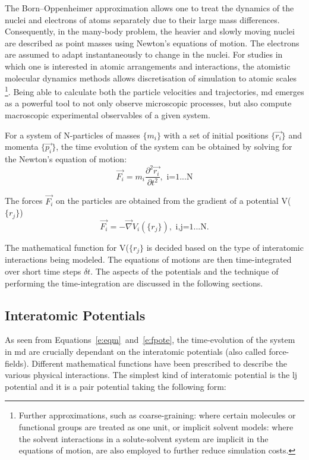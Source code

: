 The Born–Oppenheimer approximation \cite{Born1927} allows one to treat the dynamics of the nuclei and electrons of atoms separately due to their large mass differences. Consequently, in the many-body problem, the heavier and slowly moving nuclei are described as point masses using Newton's equations of motion. The electrons are assumed to adapt instantaneously to change in the nuclei. For studies in which one is interested in atomic arrangements and interactions, the atomistic molecular dynamics methods allows discretisation of simulation to atomic scales \footnote{Further approximations, such as coarse-graining: where certain molecules or functional groups are treated as one unit, or implicit solvent models: where the solvent interactions in a solute-solvent system are implicit in the equations of motion, are also employed to further reduce simulation costs.}. Being able to calculate both the particle velocities and trajectories, \gls{md} emerges as a powerful tool to not only observe microscopic processes, but also compute macroscopic experimental observables of a given system. \par

For a system of N-particles of masses $\{m_i\}$ with a set of initial positions $\{ \vec{r_i} \}$ and momenta $\{ \vec{p_i} \}$, the time evolution of the system can be obtained by solving for the Newton's equation of motion:
\begin{equation} \label{e:eqm}
\vec{F_i} = m_i \frac{\partial^2 \vec{r_i}}{\partial t^2}, \text{ i=1...N}
\end{equation}

The forces $\vec{F_i}$ on the particles are obtained from the gradient of a potential V($\{r_j\}$)
 \begin{equation} \label{e:fpote}
\vec{F_i} = -\vec{\nabla} V_i (\{r_j\}), \text{ i,j=1...N}.
\end{equation}

The mathematical function for V($\{r_j\}$ is decided based on the type of interatomic interactions being modeled. The equations of motions are then time-integrated over short time steps $\delta t$. The aspects of the potentials and the technique of performing the time-integration are discussed in the following sections.

\subsection{Interatomic Potentials} \label{s:ffs}
As seen from Equations~\ref{e:eqm}~and~\ref{e:fpote}, the time-evolution of the system in \gls{md} are crucially dependant on the interatomic potentials (also called force-fields). Different mathematical functions have been prescribed to describe the various physical interactions. The simplest kind of interatomic potential is the \gls{lj} potential and it is a pair potential taking the following form:

